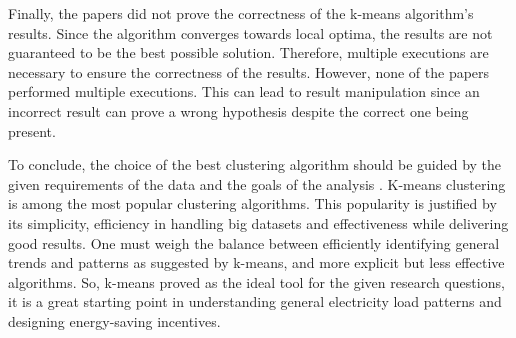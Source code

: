 Finally, the papers did not prove the correctness of the k-means algorithm's results.
Since the algorithm converges towards local optima, the results are not guaranteed to be the best possible solution.
Therefore, multiple executions are necessary to ensure the correctness of the results.
However, none of the papers performed multiple executions.
This can lead to result manipulation since an incorrect result can prove a wrong hypothesis despite the correct one being present.

To conclude, the choice of the best clustering algorithm should be guided by the given requirements of the data and the goals of the analysis \cite{COL-ALT}.
K-means clustering is among the most popular clustering algorithms.
This popularity is justified by its simplicity, efficiency in handling big datasets and effectiveness while delivering good results.
One must weigh the balance between efficiently identifying general trends and patterns as suggested by k-means, and more explicit but less effective algorithms.
So, k-means proved as the ideal tool for the given research questions, it is a great starting point in understanding general electricity load patterns and designing energy-saving incentives.

